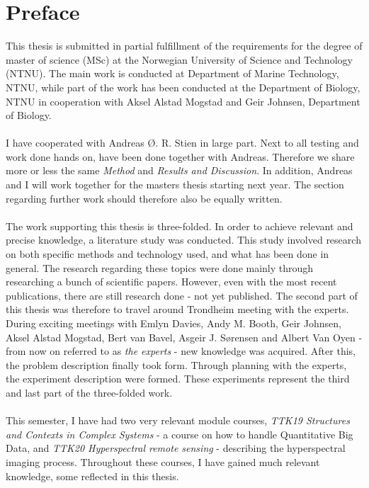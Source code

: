 \hypersetup{pageanchor=true}
%
\chapter*{Preface}
This thesis is submitted in partial fulfillment of the requirements for the degree of master of science (MSc) at the Norwegian University of Science and Technology (NTNU). The main work is conducted at Department of Marine Technology, NTNU, while part of the work has been conducted at the Department of Biology, NTNU in cooperation with Aksel Alstad Mogstad and Geir Johnsen, Department of Biology. 
\\\\
I have cooperated with Andreas {\O}. R. Stien in large part. Next to all testing and work done hands on, have been done together with Andreas. Therefore we share more or less the same \textit{Method} and \textit{Results and Discussion}. In addition, Andreas and I will work together for the masters thesis starting next year. The section regarding further work should therefore also be equally written. 
\\\\
The work supporting this thesis is three-folded. In order to achieve relevant and precise knowledge, a literature study was conducted. This study involved research on both specific methods and technology used, and what has been done in general. The research regarding these topics were done mainly through researching a bunch of scientific papers. However, even with the most recent publications, there are still research done - not yet published. The second part of this thesis was therefore to travel around Trondheim meeting with the experts. During exciting meetings with Emlyn Davies, Andy M. Booth, Geir Johnsen, Aksel Alstad Mogstad, Bert van Bavel, Asgeir J. S{\o}rensen and Albert Van Oyen - from now on referred to as \textit{the experts} - new knowledge was acquired. After this, the problem description finally took form. Through planning with the experts, the experiment description were formed. These experiments represent the third and last part of the three-folded work. 
\\\\
This semester, I have had two very relevant module courses, \textit{TTK19 Structures and Contexts in Complex Systems} -  a course on how to handle Quantitative Big Data, and \textit{TTK20 Hyperspectral remote sensing} - describing the hyperspectral imaging process. Throughout these courses, I have gained much relevant knowledge, some reflected in this thesis.


\begin{comment}
\newline
\newline

\newline
\newline
\newline
\newline
\newline
\newline
\begin{center}
    Trondheim, November 14, 2018
    \end{center}
\begin{figure}[H]
\centering
\end{figure}
\begin{center}
Emilie Dahl
\end{center}
\end{comment}